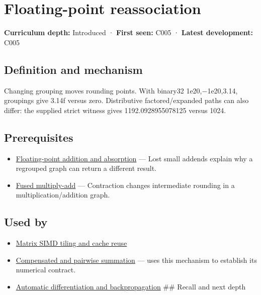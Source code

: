 \hypertarget{appendix-c2ac4a84c283}{}\label{referencestart:appendix-c2ac4a84c283}
\section{Floating-point reassociation}\label{appendix-c2ac4a84c283-floating-point-reassociation}

\textbf{Curriculum depth:} Introduced · \textbf{First seen:} C005 · \textbf{Latest development:} C005

\subsection{Definition and mechanism}\label{appendix-c2ac4a84c283-definition-and-mechanism}

Changing grouping moves rounding points. With binary32 1e20,−1e20,3.14, groupings give 3.14f versus zero. Distributive factored/expanded paths can also differ: the supplied strict witness gives 1192.0928955078125 versus 1024.

\subsection{Prerequisites}\label{appendix-c2ac4a84c283-prerequisites}

\begin{itemize}
\tightlist
\item
  \hyperref[appendix-a1b1b4580dfd]{Floating-point addition and absorption} --- Lost small addends explain why a regrouped graph can return a different result.
\item
  \hyperref[appendix-41e8ef22a21e]{Fused multiply-add} --- Contraction changes intermediate rounding in a multiplication/addition graph.
\end{itemize}

\subsection{Used by}\label{appendix-c2ac4a84c283-used-by}

\begin{itemize}
\item
  \hyperref[appendix-1bfb7c657105]{Matrix SIMD tiling and cache reuse}
\item
  \hyperref[appendix-df318da57389]{Compensated and pairwise summation} --- uses this mechanism to establish its numerical contract.
\item
  \hyperref[appendix-40df0855b4a7]{Automatic differentiation and backpropagation} \#\# Recall and next depth
\end{itemize}

